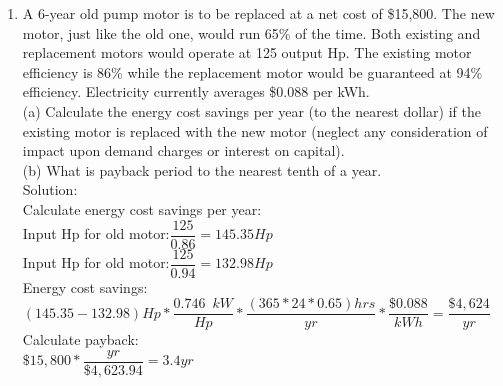 \begin{enumerate}[1.]
\item A 6-year old pump motor is to be replaced at a net cost of \$15,800. The new motor, just like the old one, would run 65\% of the time. Both existing and replacement motors would operate at 125 output Hp. The existing motor efficiency is 86\% while the replacement motor would be guaranteed at 94\% efficiency. Electricity currently averages \$0.088 per kWh.\\
\vspace{0.4cm}
(a) Calculate the energy cost savings per year (to the nearest dollar) if the existing motor is replaced with the new motor (neglect any consideration of impact upon demand charges or interest on capital).\\
\vspace{0.4cm}
(b) What is payback period to the nearest tenth of a year.\\
\vspace{0.4cm}
Solution:\\
\vspace{0.4cm}
Calculate energy cost savings per year:\\
\vspace{0.4cm}
Input Hp for old motor:$\dfrac{125}{0.86}=145.35Hp$\\
\vspace{0.4cm}
Input Hp for old motor:$\dfrac{125}{0.94}=132.98Hp$\\
\vspace{0.4cm}
Energy cost savings:\\$(145.35-132.98)Hp*\dfrac{0.746 \enspace kW}{Hp}*\dfrac{(365*24*0.65)hrs}{yr}*\dfrac{\$0.088}{kWh}=\boxed{\dfrac{\$4,624}{yr}}$\\
\vspace{0.4cm}
Calculate payback:\\
\vspace{0.4cm}
$\$15,800*\dfrac{yr}{\$4,623.94}=\boxed{3.4yr}$


\end{enumerate}
